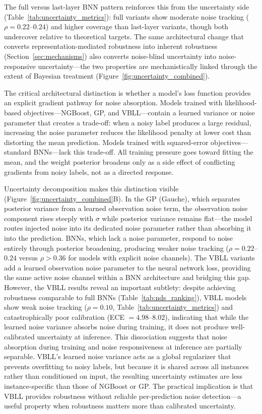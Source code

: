 \documentclass[pdflatex,sn-mathphys-num]{sn-jnl}%
\theoremstyle{thmstyleone}%
\theoremstyle{thmstyletwo}%
\theoremstyle{thmstylethree}%
\begin{document}
The full versus last-layer BNN pattern reinforces this from the uncertainty side (Table~\ref{tab:uncertainty_metrics}): full variants show moderate noise tracking ($\rho = 0.22$--$0.24$) and higher coverage than last-layer variants, though both undercover relative to theoretical targets. The same architectural change that converts representation-mediated robustness into inherent robustness (Section~\ref{sec:mechanisms}) also converts noise-blind uncertainty into noise-responsive uncertainty---the two properties are mechanistically linked through the extent of Bayesian treatment (Figure~\ref{fig:uncertainty_combined}).

The critical architectural distinction is whether a model's loss function provides an explicit gradient pathway for noise absorption. Models trained with likelihood-based objectives---NGBoost, GP, and VBLL---contain a learned variance or noise parameter that creates a trade-off: when a noisy label produces a large residual, increasing the noise parameter reduces the likelihood penalty at lower cost than distorting the mean prediction. Models trained with squared-error objectives---standard BNNs---lack this trade-off. All training pressure goes toward fitting the mean, and the weight posterior broadens only as a side effect of conflicting gradients from noisy labels, not as a directed response.

Uncertainty decomposition makes this distinction visible (Figure~\ref{fig:uncertainty_combined}B). In the GP (Gauche), which separates posterior variance from a learned observation noise term, the observation noise component rises steeply with $\sigma$ while posterior variance remains flat---the model routes injected noise into its dedicated noise parameter rather than absorbing it into the prediction. BNNs, which lack a noise parameter, respond to noise entirely through posterior broadening, producing weaker noise tracking ($\rho = 0.22$--$0.24$ versus $\rho > 0.36$ for models with explicit noise channels). The VBLL variants add a learned observation noise parameter to the neural network loss, providing the same active noise channel within a BNN architecture and bridging this gap. However, the VBLL results reveal an important subtlety: despite achieving robustness comparable to full BNNs (Table~\ref{tab:nds_ranking}), VBLL models show weak noise tracking ($\rho = 0.10$, Table~\ref{tab:uncertainty_metrics}) and catastrophically poor calibration (ECE $= 4.98$--$8.02$), indicating that while the learned noise variance absorbs noise during training, it does not produce well-calibrated uncertainty at inference. This dissociation suggests that noise absorption during training and noise responsiveness at inference are partially separable. VBLL's learned noise variance acts as a global regularizer that prevents overfitting to noisy labels, but because it is shared across all instances rather than conditioned on input, the resulting uncertainty estimates are less instance-specific than those of NGBoost or GP. The practical implication is that VBLL provides robustness without reliable per-prediction noise detection---a useful property when robustness matters more than calibrated uncertainty.
\end{document}
